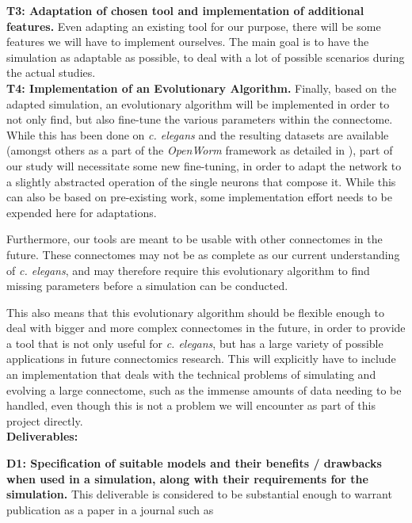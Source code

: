 \documentclass[a4paper,11pt]{article}
\begin{document}
\textbf{T3: Adaptation of chosen tool and implementation of additional features.}
Even adapting an existing tool for our purpose, there will be some features we will have to implement ourselves. The main goal is to have the simulation as adaptable as possible, to deal with a lot of possible scenarios during the actual studies. 
\\[0,2cm]

\textbf{T4: Implementation of an Evolutionary Algorithm.}
Finally, based on the adapted simulation, an evolutionary algorithm will be implemented in order to not only find, but also fine-tune the various parameters within the connectome. While this has been done on \emph{c. elegans} and the resulting datasets are available (amongst others as a part of the \emph{OpenWorm} framework as detailed in \citep{Szigeti2014}), part of our study will necessitate some new fine-tuning, in order to adapt the network to a slightly abstracted operation of the single neurons that compose it. While this can also be based on pre-existing work, some implementation effort needs to be expended here for adaptations.

Furthermore, our tools are meant to be usable with other connectomes in the future. These connectomes may not be as complete as our current understanding of \emph{c. elegans}, and may therefore require this evolutionary algorithm to find missing parameters before a simulation can be conducted.

This also means that this evolutionary algorithm should be flexible enough to deal with bigger and more complex connectomes in the future, in order to provide a tool that is not only useful for \emph{c. elegans}, but has a large variety of possible applications in future connectomics research. This will explicitly have to include an implementation that deals with the technical problems of simulating and evolving a large connectome, such as the immense amounts of data needing to be handled, even though this is not a problem we will encounter as part of this project directly.
\\[0,2cm]

\textbf{Deliverables:}

\textbf{D1: Specification of suitable models and their benefits / drawbacks when used in a simulation, along with their requirements for the simulation.} This deliverable is considered to be substantial enough to warrant publication as a paper in a journal such as 
\\[0,2cm]
\end{document}
